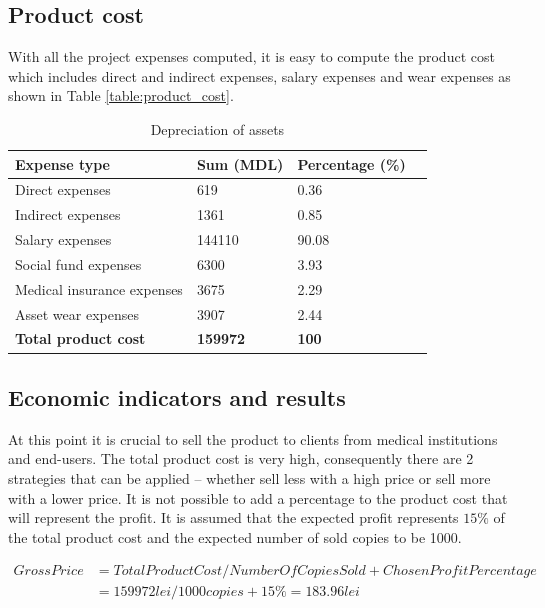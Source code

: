 \documentclass[12pt,a4paper]{report}
\begin{document}
\subsection{Product cost}
With all the project expenses computed, it is easy to compute the product cost which includes direct and indirect expenses, salary expenses and wear expenses as shown in Table \ref{table:product_cost}.

\begin{table}[!h]
\begin{center}
\begin{tabular}{| M{14em} | M{10em} | M{10em} |N}
\hline
\textbf{Expense type} & \textbf{Sum (MDL)} & \textbf{Percentage (\%)} &\\[18pt]
\hline
Direct expenses & 619 & 0.36 &\\[14pt]
\hline
Indirect expenses & 1361 & 0.85 &\\[14pt]
\hline
Salary expenses & 144110 & 90.08  &\\[14pt]
\hline
Social fund expenses & 6300 & 3.93 &\\[14pt]
\hline
Medical insurance expenses & 3675 & 2.29 &\\[14pt]
\hline
Asset wear expenses & 3907 & 2.44 &\\[14pt]
\hline
\textbf{Total product cost} & \textbf{159972} & \textbf{100} &\\[14pt] 
\hline
\end{tabular}
\caption{Depreciation of assets}
\label{table:depreciation}
\end{center}
\end{table}

\subsection{Economic indicators and results}
At this point it is crucial to sell the product to clients from medical institutions and end-users. The total product cost is very high, consequently there are 2 strategies that can be applied -- whether sell less with a high price or sell more with a lower price. It is not possible to add a percentage to the product cost that will represent the profit. It is assumed that the expected profit represents $15\%$ of the total product cost and the expected number of sold copies to be 1000. 

\begin{equation}
 \begin{split}
  Gross Price &= Total Product Cost / Number Of Copies Sold + Chosen Profit Percentage\\
              &= 159972 lei/1000 copies + 15\% = 183.96 lei
 \end{split}
\end{equation}
\end{document}
